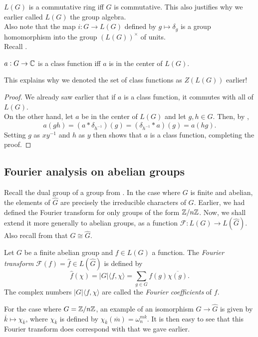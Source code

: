 			$L(G)$ is a commutative ring iff $G$ is commutative. This also justifies why we earlier called $L(G)$ the group algebra.\\
			Also note that the map $i : G \to L(G)$ defined by $g \mapsto \delta_g$ is a group homomorphism into the group $(L(G))^\times$ of units.\\
			Recall .

			\begin{fprop}
				$a : G \to \mathbb{C}$ is a class function iff $a$ is in the center of $L(G)$.
			\end{fprop}
			This explains why we denoted the set of class functions as $Z(L(G))$ earlier!
			\begin{proof}
				We already saw earlier that if $a$ is a class function, it commutes with all of $L(G)$.\\
				On the other hand, let $a$ be in the center of $L(G)$ and let $g,h \in G$. Then, by ,
				\[ a(gh) = (a * \delta_{h^{-1}})(g) = (\delta_{h^{-1}} * a) (g) = a(hg). \]
				Setting $g$ as $xy^{-1}$ and $h$ as $y$ then shows that $a$ is a class function, completing the proof.
			\end{proof}

	\subsection{Fourier analysis on abelian groups}

		Recall the dual group of a group from . In the case where $G$ is finite and abelian, the elements of $\hat{G}$ are precisely the irreducible characters of $G$. Earlier, we had defined the Fourier transform for only groups of the form $\mathbb{Z}/n\mathbb{Z}$. Now, we shall extend it more generally to abelian groups, as a function $\mathcal{F} : L(G) \to L(\hat{G})$. Also recall from  that $G \cong \hat{G}$.

		\begin{fdef}
			Let $G$ be a finite abelian group and $f \in L(G)$ a function. The \emph{Fourier transform} $\mathcal{F}(f) = \hat{f} \in L(\hat{G})$ is defined by
			\[ \hat{f}(\chi) = |G|\langle f,\chi\rangle = \sum_{g \in G} f(g) \overline{\chi(g)}. \]
			The complex numbers $|G| \langle f,\chi\rangle$ are called the \emph{Fourier coefficients} of $f$.
		\end{fdef}

		For the case where $G = \mathbb{Z}/n\mathbb{Z}$, an example of an isomorphism $G \to \hat{G}$ is given by $\overline{k} \mapsto \chi_{\overline{k}}$, where $\chi_{\overline{k}}$ is defined by $\chi_{\overline{k}}(\overline{m}) = \omega_n^{mk}$. It is then easy to see that this Fourier transform does correspond with that we gave earlier.\\

